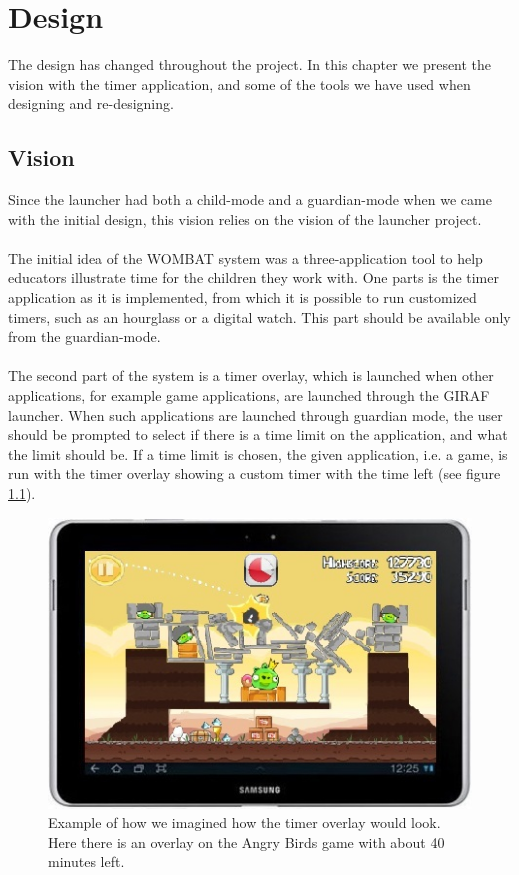 \chapter{Design}
The design has changed throughout the project. In this chapter we present the vision with the timer application, and some of the tools we have used when designing and re-designing.

\section{Vision}
\label{sec:vision}
Since the launcher had both a child-mode and a guardian-mode when we came with the initial design, this vision relies on the vision of the launcher project.\\ \\
	The initial idea of the WOMBAT system was a three-application tool to help educators illustrate time for the children they work with. One parts is the timer application as it is implemented, from which it is possible to run customized timers, such as an hourglass or a digital watch. This part should be available only from the guardian-mode.\\ \\
  The second part of the system is a timer overlay, which is launched when other applications, for example game applications, are launched through the GIRAF launcher. When such applications are launched through guardian mode, the user should be prompted to select if there is a time limit on the application, and what the limit should be. If a time limit is chosen, the given application, i.e. a game, is run with the timer overlay showing a custom timer with the time left (see figure \ref{fig:init_overlay_drawings}).
	
	\begin{figure}[H]
		\centering
			\includegraphics[width=\textwidth]{Images/paper_prototype/overlay.png}
				\caption{Example of how we imagined how the timer overlay would look. Here there is an overlay on the Angry Birds game with about 40 minutes left.}
		\label{fig:init_overlay_drawings}
	\end{figure}
	
